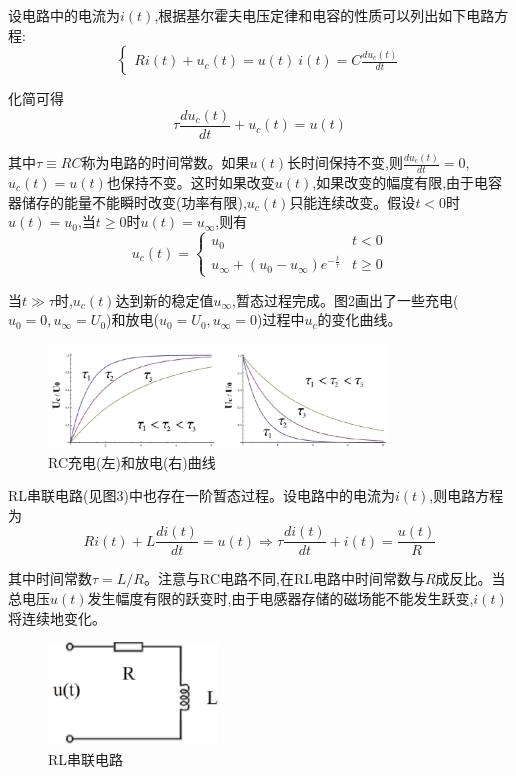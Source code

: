 \documentclass[UTF8]{ctexart}
\begin{document}
设电路中的电流为$i(t)$,根据基尔霍夫电压定律和电容的性质可以列出如下电路方程:
\begin{equation}
\begin{cases}
Ri(t)+u_c(t)=u(t)\
i(t)=C\frac{du_c(t)}{dt}
\end{cases}
\end{equation}

化简可得
\begin{equation}
\tau\frac{du_c(t)}{dt}+u_c(t)=u(t)
\end{equation}

其中$\tau\equiv RC$称为电路的时间常数。如果$u(t)$长时间保持不变,则$\frac{du_c(t)}{dt}=0$,$u_c(t)=u(t)$也保持不变。这时如果改变$u(t)$,如果改变的幅度有限,由于电容器储存的能量不能瞬时改变(功率有限),$u_c(t)$只能连续改变。假设$t<0$时$u(t)=u_0$,当$t\geq 0$时$u(t)=u_\infty$,则有
\begin{equation}
u_c(t)=
\begin{cases}
u_0 & t<0\\
u_\infty+(u_0-u_\infty)e^{-\frac{t}{\tau}} & t\geq 0
\end{cases}
\end{equation}

当$t\gg\tau$时,$u_c(t)$达到新的稳定值$u_\infty$,暂态过程完成。图2画出了一些充电($u_0=0,u_\infty=U_0$)和放电($u_0=U_0,u_\infty=0$)过程中$u_c$的变化曲线。
\begin{figure}[ht]
\centering
\includegraphics[width=0.8\textwidth]{RC_charge_discharge.png}
\caption{RC充电(左)和放电(右)曲线}
\end{figure}

RL串联电路(见图3)中也存在一阶暂态过程。设电路中的电流为$i(t)$,则电路方程为
\begin{equation}
Ri(t)+L\frac{di(t)}{dt}=u(t)\Rightarrow\tau\frac{di(t)}{dt}+i(t)=\frac{u(t)}{R}
\end{equation}

其中时间常数$\tau=L/R$。注意与RC电路不同,在RL电路中时间常数与$R$成反比。当总电压$u(t)$发生幅度有限的跃变时,由于电感器存储的磁场能不能发生跃变,$i(t)$将连续地变化。
\begin{figure}[htbp]
\centering
\includegraphics[width=0.4\textwidth]{RL.png}
\caption{RL串联电路}
\end{figure}
\end{document}
